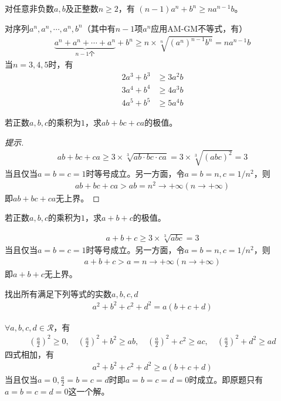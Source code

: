 \begin{example}
  对任意非负数$a,b$及正整数$n\ge2$，有 $(n-1)a^n + b^n\ge na^{n-1}b$。
\end{example}
对序列$a^n,a^n,\cdots,a^n,b^n$（其中有$n-1$项$a^n$应用AM-GM不等式，有）
\begin{align*}
  \underbrace{a^n + a^n + \cdots + a^n}_{n-1\text{个}} + b^n \ge
  n\times \sqrt[n]{\left(a^n\right)^{n-1} b^n}
  = na^{n-1}b
\end{align*}
当$n=3,4,5$时，有
\begin{align*}
  2a^3 + b^3&\ge 3a^2b\\
  3a^4 + b^4&\ge 4a^3b\\
  4a^5 + b^5&\ge 5a^4b
\end{align*}

\begin{example}
  若正数$a,b,c$的乘积为$1$，求$ab+bc+ca$的极值。
\end{example}
\begin{proof}[提示]
\begin{align*}
  ab+bc+ca\ge 3\times\sqrt[3]{ab\cdot bc\cdot ca}=3\times\sqrt[3]{(abc)^2}=3
\end{align*}
当且仅当$a=b=c=1$时等号成立。另一方面，令$a=b=n,c=1/n^2$，则
\begin{align*}
  ab+bc+ca>ab=n^2\to+\infty (n\to+\infty)
\end{align*}
即$ab+bc+ca$无上界。
\end{proof}


\begin{example}
  若正数$a,b,c$的乘积为$1$，求$a+b+c$的极值。
\end{example}
\begin{align*}
  a+b+c\ge 3\times\sqrt[3]{abc}=3
\end{align*}
当且仅当$a=b=c=1$时等号成立。另一方面，令$a=b=n,c=1/n^2$，则
\begin{align*}
  a+b+c>a=n\to+\infty(n\to+\infty)
\end{align*}
即$a+b+c$无上界。

\begin{example}
  找出所有满足下列等式的实数$a,b,c,d$
  \begin{align*}
    a^2+b^2+c^2+d^2=a(b+c+d)
  \end{align*}
\end{example}

$\forall a,b,c,d\in\mathcal{R}$，有
\begin{align*}
  \left(\frac a2\right)^2\ge 0,\quad \left(\frac a2\right)^2 + b^2\ge ab,
  \quad \left(\frac a2\right)^2 + c^2\ge ac, \quad \left(\frac a2\right)^2 + d^2\ge ad
\end{align*}
四式相加，有
\begin{align*}
  a^2+b^2+c^2+d^2\ge a(b+c+d)
\end{align*}
当且仅当$a=0, \frac a2=b=c=d$时即$a=b=c=d=0$时成立。即原题只有$a=b=c=d=0$这一个解。

